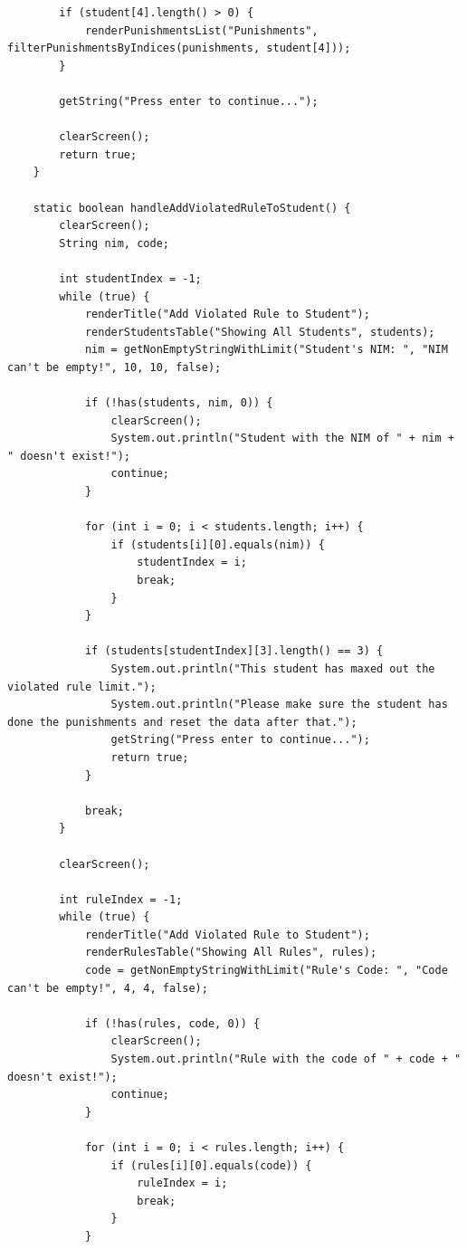 \documentclass[12pt,titlepage]{article}
\begin{document}
\begin{verbatim}
        if (student[4].length() > 0) {
            renderPunishmentsList("Punishments", filterPunishmentsByIndices(punishments, student[4]));
        }

        getString("Press enter to continue...");

        clearScreen();
        return true;
    }

    static boolean handleAddViolatedRuleToStudent() {
        clearScreen();
        String nim, code;

        int studentIndex = -1;
        while (true) {
            renderTitle("Add Violated Rule to Student");
            renderStudentsTable("Showing All Students", students);
            nim = getNonEmptyStringWithLimit("Student's NIM: ", "NIM can't be empty!", 10, 10, false);

            if (!has(students, nim, 0)) {
                clearScreen();
                System.out.println("Student with the NIM of " + nim + " doesn't exist!");
                continue;
            }

            for (int i = 0; i < students.length; i++) {
                if (students[i][0].equals(nim)) {
                    studentIndex = i;
                    break;
                }
            }

            if (students[studentIndex][3].length() == 3) {
                System.out.println("This student has maxed out the violated rule limit.");
                System.out.println("Please make sure the student has done the punishments and reset the data after that.");
                getString("Press enter to continue...");
                return true;
            }

            break;
        }

        clearScreen();

        int ruleIndex = -1;
        while (true) {
            renderTitle("Add Violated Rule to Student");
            renderRulesTable("Showing All Rules", rules);
            code = getNonEmptyStringWithLimit("Rule's Code: ", "Code can't be empty!", 4, 4, false);

            if (!has(rules, code, 0)) {
                clearScreen();
                System.out.println("Rule with the code of " + code + " doesn't exist!");
                continue;
            }

            for (int i = 0; i < rules.length; i++) {
                if (rules[i][0].equals(code)) {
                    ruleIndex = i;
                    break;
                }
            }


\end{verbatim}
\end{document}
